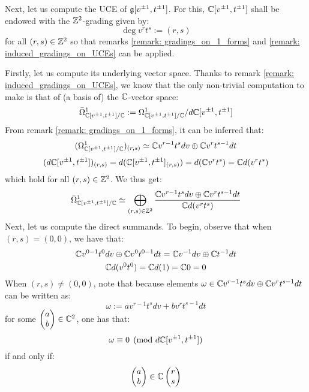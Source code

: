         \begin{example} \label{example: toroidal_lie_algebras_centres}
            Next, let us compute the UCE of $\mathfrak{g}[v^{\pm 1}, t^{\pm 1}]$. For this, $\mathbb{C}[v^{\pm 1}, t^{\pm 1}]$ shall be endowed with the $\mathbb{Z}^2$-grading given by:
                $$\deg v^r t^s := (r, s)$$
            for all $(r, s) \in \mathbb{Z}^2$ so that remarks \ref{remark: gradings_on_1_forms} and \ref{remark: induced_gradings_on_UCEs} can be applied. 
            
            Firstly, let us compute its underlying vector space. Thanks to remark \ref{remark: induced_gradings_on_UCEs}, we know that the only non-trivial computation to make is that of (a basis of) the $\mathbb{C}$-vector space:
                $$\bar{\Omega}^1_{\mathbb{C}[v^{\pm 1}, t^{\pm 1}]/\mathbb{C}} := \Omega^1_{\mathbb{C}[v^{\pm 1}, t^{\pm 1}]/\mathbb{C}}/d\mathbb{C}[v^{\pm 1}, t^{\pm 1}]$$
            From remark \ref{remark: gradings_on_1_forms}, it can be inferred that:
                $$( \Omega^1_{\mathbb{C}[v^{\pm 1}, t^{\pm 1}]/\mathbb{C}} )_{(r, s)} \simeq \mathbb{C} v^{r - 1} t^s dv \oplus \mathbb{C} v^r t^{s - 1} dt$$
                $$( d\mathbb{C}[v^{\pm 1}, t^{\pm 1}] )_{(r, s)} = d( \mathbb{C}[v^{\pm 1}, t^{\pm 1}]_{(r, s)} ) = d( \mathbb{C} v^r t^s ) = \mathbb{C} d(v^r t^s)$$
            which hold for all $(r, s) \in \mathbb{Z}^2$. We thus get:
                $$\bar{\Omega}^1_{\mathbb{C}[v^{\pm 1}, t^{\pm 1}]/\mathbb{C}} \simeq \bigoplus_{(r, s) \in \mathbb{Z}^2} \frac{ \mathbb{C} v^{r - 1} t^s dv \oplus \mathbb{C} v^r t^{s - 1} dt }{ \mathbb{C} d(v^r t^s) }$$
            Next, let us compute the direct summands. To begin, observe that when $(r, s) = (0, 0)$, we have that:
                $$\mathbb{C} v^{0 - 1} t^0 dv \oplus \mathbb{C} v^0 t^{0 - 1} dt = \mathbb{C} v^{-1} dv \oplus \mathbb{C} t^{-1} dt$$
                $$\mathbb{C} d(v^0 t^0) = \mathbb{C} d(1) = \mathbb{C} 0 = 0$$
            When $(r, s) \not = (0, 0)$, note that because elements $\omega \in \mathbb{C} v^{r - 1} t^s dv \oplus \mathbb{C} v^r t^{s - 1} dt$ can be written as:
                $$\omega := a v^{r - 1} t^s dv + b v^r t^{s - 1} dt$$
            for some $\begin{pmatrix}a \\ b\end{pmatrix} \in \mathbb{C}^2$, one has that:
                $$\omega \equiv 0 \pmod{d\mathbb{C}[v^{\pm 1}, t^{\pm 1}]}$$
            if and only if:
                $$\begin{pmatrix}a \\ b\end{pmatrix} \in \mathbb{C} \begin{pmatrix}r \\ s\end{pmatrix} $$

\end{example}
